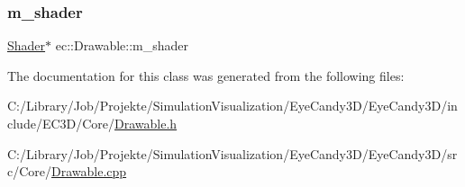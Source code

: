 \subsubsection{\texorpdfstring{m\+\_\+shader}{m\_shader}}
{\footnotesize\ttfamily \mbox{\hyperlink{classec_1_1_shader}{Shader}}$\ast$ ec\+::\+Drawable\+::m\+\_\+shader\hspace{0.3cm}{\ttfamily [protected]}}



The documentation for this class was generated from the following files\+:\begin{DoxyCompactItemize}
\item 
C\+:/\+Library/\+Job/\+Projekte/\+Simulation\+Visualization/\+Eye\+Candy3\+D/\+Eye\+Candy3\+D/include/\+E\+C3\+D/\+Core/\mbox{\hyperlink{_drawable_8h}{Drawable.\+h}}\item 
C\+:/\+Library/\+Job/\+Projekte/\+Simulation\+Visualization/\+Eye\+Candy3\+D/\+Eye\+Candy3\+D/src/\+Core/\mbox{\hyperlink{_drawable_8cpp}{Drawable.\+cpp}}\end{DoxyCompactItemize}

